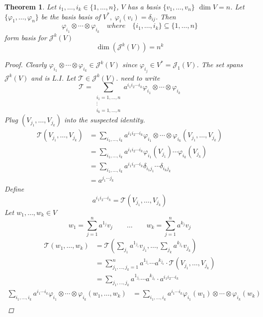 \documentclass[12pt]{article}
\newtheorem{theorem}{Theorem}[section]
\begin{document}
\begin{theorem}
Let $i_1,\dots , i_k \in \{1,\dots, n\}$, $V$ has a basis $\{v_1, \dots , v_n\}$ $\dim V = n$. Let $\{\varphi_1, \dots , \varphi_n\}$ be the basis basis of $V^{*}, \; \varphi_i(v_i)=\delta_{ij}$. Then
\[\varphi_{i_1}\otimes \cdots \otimes \varphi_{i_k} \quad where \quad \{i_1, \dots ,i_k\} \subseteq \{1, \dots , n\}\]
form basis for $\mathcal{J}^k(V)$
\[\dim(\mathcal{J}^k(V)) = n^k\]
\begin{proof}
Clearly $\varphi_{i_1}\otimes \cdots \otimes \varphi_{i_k} \in \mathcal{J}^k(V)$ since $\varphi_{i_j} \in V^* = \mathcal{J}_1(V)$. The set spans $\mathcal{J}^k(V)$ and is $L.I.$ Let $\mathcal{T} \in \mathcal{J}^k(V).$ need to write
\[\mathcal{T} = \sum_{\substack{
   i_1 = 1,\dots , n \\
\vdots\\
 i_k = 1,\dots , n  
  }} a^{i_1i_2\cdots i_k}\varphi_{i_1}\otimes\cdots\otimes\varphi_{i_k}\]
Plug $(V_{j_1}, \dots , V_{j_k})$ into the suspected identity.
\begin{align*}\mathcal{T}(V_{j_1}, \dots , V_{j_k}) &= \sum\limits_{i_1,\dots , i_k}a^{i_1i_2\cdots i_k}\varphi_{i_1}\otimes\cdots\otimes\varphi_{i_k}(V_{j_1}, \dots , V_{j_k}) \\
 &= \sum\limits_{i_1,\dots , i_k}a^{i_1i_2\cdots i_k}\varphi_{i_1}(V_{j_1})\cdots\varphi_{i_k}(V_{j_k})\\
 &= \sum\limits_{i_1,\dots , i_k}a^{i_1i_2\cdots i_k}\delta_{i_1 j_1}\cdots\delta_{i_k j_k}\\
&= a^{j_1\cdots j_k} \end{align*}
Define
\[a^{i_1i_2\cdots i_k} = \mathcal{T}(V_{j_1}, \dots , V_{j_k})\]
Let $w_1,\dots , w_k \in V$
\[w_1 = \sum\limits_{j=1}^{n}a^{1_j}v_j \qquad \dots \qquad w_k = \sum\limits_{j=1}^{n}a^{k_j}v_j\]
\begin{align*} \mathcal{T}(w_1 , \dots , w_k) &= \mathcal{T}\left( \sum\limits_{j_1}a^{1_{j_1}}v_{j_1} , \dots , \sum\limits_{j_k}a^{k_{j_k}}v_{j_k} \right)\\
&= \sum\limits_{j_1, \dots, j_k =1}^{n}a^{1_{j_1}}\cdots a^{k_{j_k}}\cdot\mathcal{T}(V_{j_1}, \dots , V_{j_k})\\
&=\sum\limits_{j_1, \dots, j_k}a^{1_{j_1}}\cdots a^{k_{j_k}}\cdot a^{i_1i_2\cdots i_k}
\end{align*}
\begin{align*}  \sum\limits_{i_1,\dots , i_k}a^{i_1\cdots i_k}\varphi_{i_1}\otimes\cdots\otimes\varphi_{i_k}(w_1, \dots , w_k) &=  \sum\limits_{i_1,\dots , i_k}a^{i_1\cdots i_k}\varphi_{i_1}(w_1)\otimes\cdots\otimes\varphi_{i_k}(w_k)\\

\end{align*}
\end{proof}
\end{theorem}
\end{document}
